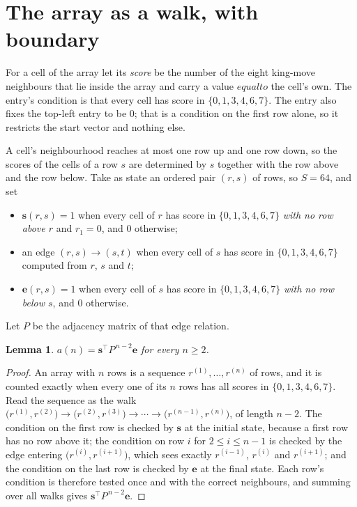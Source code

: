 \documentclass[11pt,a4paper]{article}
\theoremstyle{plain}
\newtheorem{lemma}[theorem]{Lemma}
\theoremstyle{definition}
\begin{document}
\section{The array as a walk, with boundary}

For a cell of the array let its \emph{score} be the number of the eight king-move neighbours that lie inside
the array and carry a value $equal to$ the cell's own. The entry's condition is that every cell
has score in $\{0,1,3,4,6,7\}$. The entry also fixes the top-left entry to be $0$; that is a condition on the first row alone, so it restricts the start vector and nothing else.

A cell's neighbourhood reaches at most one row up and one row down, so the scores of the
cells of a row $s$ are determined by $s$ together with the row above and the row below.
Take as state an ordered pair $(r,s)$ of rows, so $S=64$, and set
\begin{itemize}
\item $\mathbf{s}(r,s)=1$ when every cell of $r$ has score in $\{0,1,3,4,6,7\}$ \emph{with no row
above $r$} and $r_1=0$, and $0$ otherwise;
\item an edge $(r,s)\to(s,t)$ when every cell of $s$ has score in $\{0,1,3,4,6,7\}$ computed from
$r$, $s$ and $t$;
\item $\mathbf{e}(r,s)=1$ when every cell of $s$ has score in $\{0,1,3,4,6,7\}$ \emph{with no row
below $s$}, and $0$ otherwise.
\end{itemize}
Let $P$ be the adjacency matrix of that edge relation.

\begin{lemma}\label{lem:walk}
$a(n)=\mathbf{s}^{\!\top}P^{\,n-2}\mathbf{e}$ for every $n\ge2$.
\end{lemma}

\begin{proof}
An array with $n$ rows is a sequence $r^{(1)},\dots,r^{(n)}$ of rows, and it is counted
exactly when every one of its $n$ rows has all scores in $\{0,1,3,4,6,7\}$. Read the sequence as the
walk $\bigl(r^{(1)},r^{(2)}\bigr)\to\bigl(r^{(2)},r^{(3)}\bigr)\to\cdots\to
\bigl(r^{(n-1)},r^{(n)}\bigr)$, of length $n-2$. The condition on the first row is
checked by $\mathbf{s}$ at the initial state, because a first row has no row above it; the
condition on row $i$ for $2\le i\le n-1$ is checked by the edge entering
$\bigl(r^{(i)},r^{(i+1)}\bigr)$, which sees exactly $r^{(i-1)}$, $r^{(i)}$ and
$r^{(i+1)}$; and the condition on the last row is checked by $\mathbf{e}$ at the final
state. Each row's condition is therefore tested once and with the correct neighbours, and
summing over all walks gives $\mathbf{s}^{\!\top}P^{\,n-2}\mathbf{e}$.
\end{proof}
\end{document}
